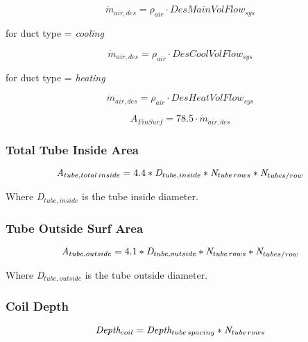 \begin{equation}
\dot m_{air,des} = \rho_{air} \cdot DesMainVolFlow_{sys}
\end{equation}

for duct type = \emph{cooling}

\begin{equation}
\dot m_{air,des} = \rho_{air} \cdot DesCoolVolFlow_{sys}
\end{equation}

for duct type = \emph{heating}

\begin{equation}
\dot m_{air,des} = \rho_{air} \cdot DesHeatVolFlow_{sys}
\end{equation}

\begin{equation}
A_{FinSurf} = 78.5 \cdot \dot m_{air,des}
\end{equation}

\subsubsection{Total Tube Inside Area}\label{total-tube-inside-area}

\begin{equation}
\emph{A\(_{tube,total\, inside}\)} = 4.4 *\emph{D\(_{tube,inside}\)} *\emph{N\(_{tube\, rows}\)} *\emph{N\(_{tubes/row}\)}
\end{equation}

Where \emph{D\(_{tube,inside}\)} is the tube inside diameter.

\subsubsection{Tube Outside Surf Area}\label{tube-outside-surf-area}

\begin{equation}
\emph{A\(_{tube,outside}\)} = 4.1 *\emph{D\(_{tube,outside}\)} *\emph{N\(_{tube\, rows}\)} *\emph{N\(_{tubes/row}\)}
\end{equation}

Where \emph{D\(_{tube,outside}\)} is the tube outside diameter.

\subsubsection{Coil Depth}\label{coil-depth}

\begin{equation}
\emph{Depth\(_{coil}\)} = \emph{Depth\(_{tube\, spacing}\)} * \emph{N\(_{tube\, rows}\)}
\end{equation}


